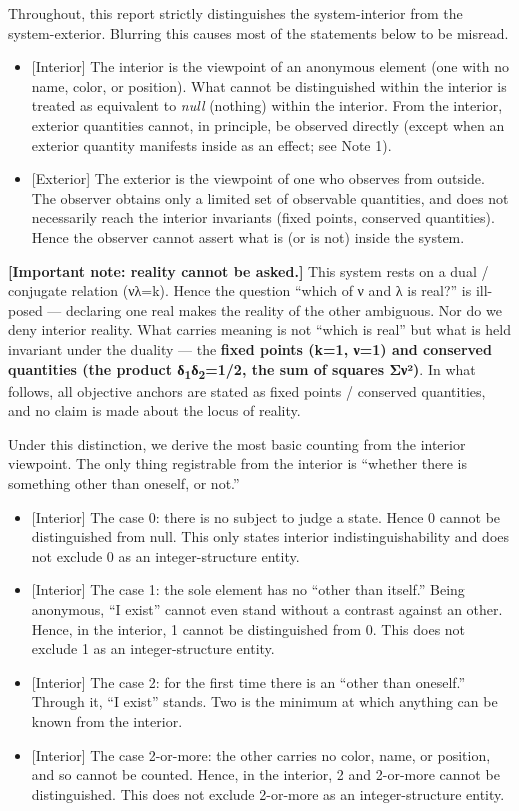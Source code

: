 \documentclass[11pt]{ltjsarticle}
\providecommand{\tightlist}{\setlength{\itemsep}{0pt}\setlength{\parskip}{0pt}}
\begin{document}
Throughout, this report strictly distinguishes the system-interior from
the system-exterior. Blurring this causes most of the statements below
to be misread.

\begin{itemize}
\tightlist
\item
  {[}Interior{]} The interior is the viewpoint of an anonymous element
  (one with no name, color, or position). What cannot be distinguished
  within the interior is treated as equivalent to \emph{null} (nothing)
  within the interior. From the interior, exterior quantities cannot, in
  principle, be observed directly (except when an exterior quantity
  manifests inside as an effect; see Note 1).
\item
  {[}Exterior{]} The exterior is the viewpoint of one who observes from
  outside. The observer obtains only a limited set of observable
  quantities, and does not necessarily reach the interior invariants
  (fixed points, conserved quantities). Hence the observer cannot assert
  what is (or is not) inside the system.
\end{itemize}

\textbf{{[}Important note: reality cannot be asked.{]}} This system
rests on a dual / conjugate relation (νλ=k). Hence the question ``which
of ν and λ is real?'' is ill-posed --- declaring one real makes the
reality of the other ambiguous. Nor do we deny interior reality. What
carries meaning is not ``which is real'' but what is held invariant
under the duality --- the \textbf{fixed points (k=1, ν=1) and conserved
quantities (the product δ\textsubscript{1}δ\textsubscript{2}=1/2, the sum of squares Σν²)}. In what
follows, all objective anchors are stated as fixed points / conserved
quantities, and no claim is made about the locus of reality.

Under this distinction, we derive the most basic counting from the
interior viewpoint. The only thing registrable from the interior is
``whether there is something other than oneself, or not.''

\begin{itemize}
\tightlist
\item
  {[}Interior{]} The case 0: there is no subject to judge a state. Hence
  0 cannot be distinguished from null. This only states interior
  indistinguishability and does not exclude 0 as an integer-structure
  entity.
\item
  {[}Interior{]} The case 1: the sole element has no ``other than
  itself.'' Being anonymous, ``I exist'' cannot even stand without a
  contrast against an other. Hence, in the interior, 1 cannot be
  distinguished from 0. This does not exclude 1 as an integer-structure
  entity.
\item
  {[}Interior{]} The case 2: for the first time there is an ``other than
  oneself.'' Through it, ``I exist'' stands. Two is the minimum at which
  anything can be known from the interior.
\item
  {[}Interior{]} The case 2-or-more: the other carries no color, name,
  or position, and so cannot be counted. Hence, in the interior, 2 and
  2-or-more cannot be distinguished. This does not exclude 2-or-more as
  an integer-structure entity.
\end{itemize}
\end{document}
